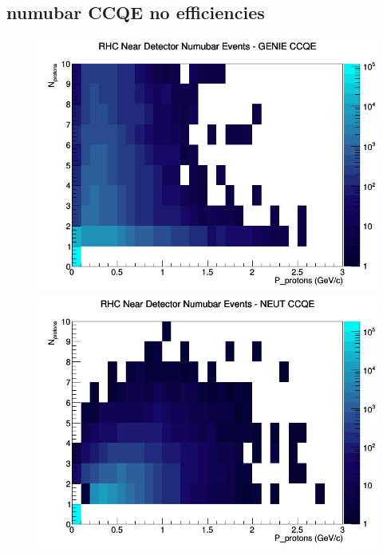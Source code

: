 \documentclass[12pt]{article}
\begin{document}
\subsection{numubar CCQE no efficiencies}
\begin{figure}[h]
\includegraphics[width=\linewidth]{N_P/nominal/protons/CCQE_RHC_ND_numubar_N_P_GENIE.png}
\endminipage
{}
\includegraphics[width=\linewidth]{N_P/nominal/protons/CCQE_RHC_ND_numubar_N_P_NEUT.png}
\endminipage
{}

\end{figure}
\end{document}
